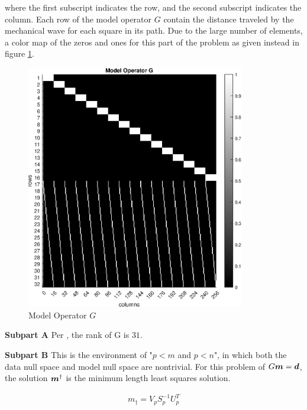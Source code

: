 where the first subscript indicates the row, and the second subscript indicates the column. Each row of the model operator $G$ contain the distance traveled by the mechanical wave for each square in its path. Due to the large number of elements, a color map of the zeros and ones for this part of the problem as given instead in figure \ref{fig: prob2 part A model operator G}.

\begin{figure}[h] 
	\centering
	\includegraphics[width=0.85\textwidth]{./images/prob2_partA_model_operator_G.eps}
	\caption{Model Operator $G$}
	\label{fig: prob2 part A model operator G}
\end{figure}
\FloatBarrier

\textbf{Subpart A} \newline
Per \MATLAB, the rank of G is $31$.
\newline

\textbf{Subpart B} \newline
This is the environment of "$p < m$ and $p < n$", in which both the data null space and model null space are nontrivial. For this problem of $G\boldsymbol{m} = \boldsymbol{d}$, the solution $\boldsymbol{m}^\dagger$ is the minimum length least squares solution. 

\begin{align*}
	m_{\dagger} = V_p S_p^{-1} U_p^T
\end{align*}


